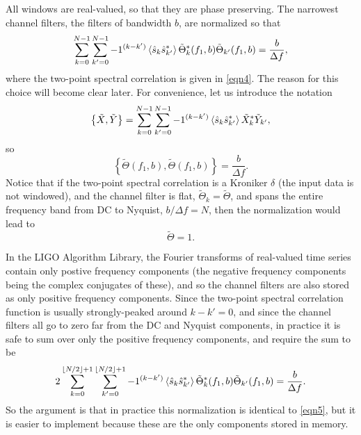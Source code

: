 \documentclass[10pt]{article}
\begin{document}
All windows are real-valued, so that they are phase preserving.  The
narrowest channel filters, the filters of bandwidth \(b\),  are normalized
so that
\begin{equation}
\label{eqn5}
\sum_{k = 0}^{N - 1} \sum_{k' = 0}^{N - 1} -1^{(k - k')} \left\langle\hat{s}_{k}
\hat{s}^{*}_{k'}\right\rangle \tilde{\Theta}^{*}_{k}(f_{1}, b)
\tilde{\Theta}_{k'}(f_{1}, b)
   = \frac{b}{\Delta f},
\end{equation}
where the two-point spectral correlation is given in \eqref{eqn4}.  The
reason for this choice will become clear later.  For convenience, let us
introduce the notation
\begin{equation}
\left\{ \tilde{X}, \tilde{Y} \right\}
   = \sum_{k = 0}^{N - 1} \sum_{k' = 0}^{N - 1} -1^{(k - k')}
   \left\langle\hat{s}_{k} \hat{s}^{*}_{k'}\right\rangle \tilde{X}^{*}_{k}
   \tilde{Y}_{k'},
\end{equation}
so
\begin{equation}
\left\{ \tilde{\Theta}(f_{1}, b), \tilde{\Theta}(f_{1}, b) \right\}
   = \frac{b}{\Delta f}.
\end{equation}
Notice that if the two-point spectral correlation is a Kroniker \(\delta\)
(the input data is not windowed), and the channel filter is flat,
\(\tilde{\Theta}_{k} = \tilde{\Theta}\), and spans the entire frequency
band from DC to Nyquist, \(b / \Delta f = N\), then the normalization would
lead to
\begin{equation}
\tilde{\Theta}
   = 1.
\end{equation}

In the LIGO Algorithm Library, the Fourier transforms of real-valued time
series contain only postive frequency components (the negative frequency
components being the complex conjugates of these), and so the channel
filters are also stored as only positive frequency components.  Since the
two-point spectral correlation function is usually strongly-peaked around
\(k - k' = 0\), and since the channel filters all go to zero far from the
DC and Nyquist components, in practice it is safe to sum over only the
positive frequency components, and require the sum to be
\begin{equation}
2 \sum_{k = 0}^{\lfloor N / 2 \rfloor + 1} \sum_{k' = 0}^{\lfloor N / 2
\rfloor + 1} -1^{(k - k')} \left\langle\hat{s}_{k} \hat{s}^{*}_{k'}\right\rangle
\tilde{\Theta}^{*}_{k}(f_{1}, b) \tilde{\Theta}_{k'}(f_{1}, b)
   = \frac{b}{\Delta f}.
\end{equation}
So the argument is that in practice this normalization is identical to
\eqref{eqn5}, but it is easier to implement because these are the only
components stored in memory.
\end{document}
